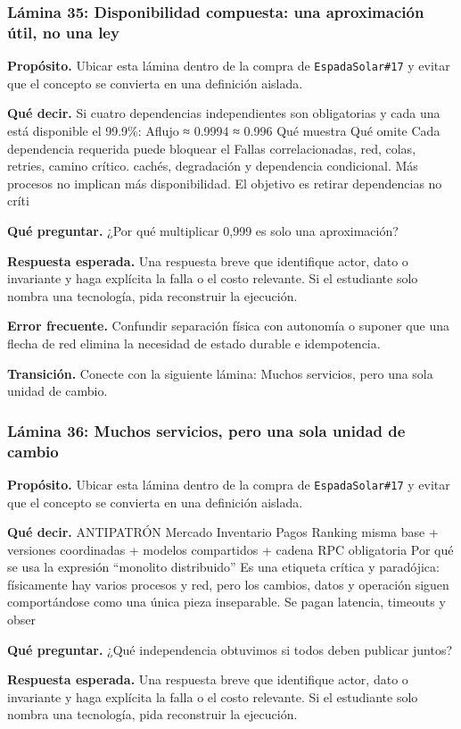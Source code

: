 \documentclass[variant=docente,cover=institutional,mode=screen]{ua-engineering-v6-article}
\begin{document}
\subsubsection*{Lámina 35: Disponibilidad compuesta: una aproximación útil, no una ley}
\textbf{Propósito.} Ubicar esta lámina dentro de la compra de \texttt{EspadaSolar\#17} y evitar que el concepto se convierta en una definición aislada.

\textbf{Qué decir.} Si cuatro dependencias independientes son obligatorias y cada una está disponible el 99.9\%: Aflujo ≈ 0.9994 ≈ 0.996 Qué muestra Qué omite Cada dependencia requerida puede bloquear el Fallas correlacionadas, red, colas, retries, camino crítico. cachés, degradación y dependencia condicional. Más procesos no implican más disponibilidad. El objetivo es retirar dependencias no críti

\textbf{Qué preguntar.} ¿Por qué multiplicar 0,999 es solo una aproximación?

\textbf{Respuesta esperada.} Una respuesta breve que identifique actor, dato o invariante y haga explícita la falla o el costo relevante. Si el estudiante solo nombra una tecnología, pida reconstruir la ejecución.

\textbf{Error frecuente.} Confundir separación física con autonomía o suponer que una flecha de red elimina la necesidad de estado durable e idempotencia.

\textbf{Transición.} Conecte con la siguiente lámina: Muchos servicios, pero una sola unidad de cambio.

\subsubsection*{Lámina 36: Muchos servicios, pero una sola unidad de cambio}
\textbf{Propósito.} Ubicar esta lámina dentro de la compra de \texttt{EspadaSolar\#17} y evitar que el concepto se convierta en una definición aislada.

\textbf{Qué decir.} ANTIPATRÓN Mercado Inventario Pagos Ranking misma base + versiones coordinadas + modelos compartidos + cadena RPC obligatoria Por qué se usa la expresión “monolito distribuido” Es una etiqueta crítica y paradójica: físicamente hay varios procesos y red, pero los cambios, datos y operación siguen comportándose como una única pieza inseparable. Se pagan latencia, timeouts y obser

\textbf{Qué preguntar.} ¿Qué independencia obtuvimos si todos deben publicar juntos?

\textbf{Respuesta esperada.} Una respuesta breve que identifique actor, dato o invariante y haga explícita la falla o el costo relevante. Si el estudiante solo nombra una tecnología, pida reconstruir la ejecución.
\end{document}
